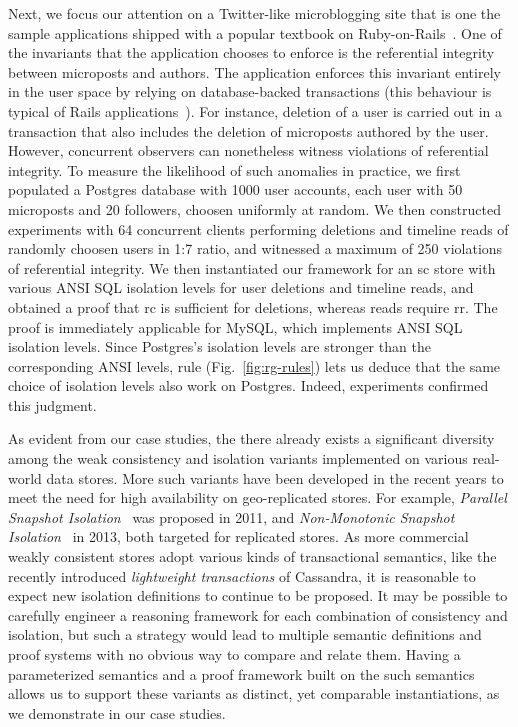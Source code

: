 Next, we focus our attention on a Twitter-like microblogging site that
is one the sample applications shipped with a popular textbook on
Ruby-on-Rails~\cite{railsbook}. One of the invariants that the
application chooses to enforce is the referential integrity between
microposts and authors. The application enforces this invariant
entirely in the user space by relying on database-backed transactions
(this behaviour is typical of Rails applications~\cite{bailisferal}).
For instance, deletion of a user is carried out in a transaction that
also includes the deletion of microposts authored by the user.
However, concurrent observers can nonetheless witness violations of
referential integrity. To measure the likelihood of such anomalies in
practice, we first populated a Postgres database with 1000 user
accounts, each user with 50 microposts and 20 followers, choosen
uniformly at random. We then constructed experiments with 64
concurrent clients performing deletions and timeline reads of randomly
choosen users in 1:7 ratio, and witnessed a maximum of 250 violations
of referential integrity. We then instantiated our framework for an
{\sc sc} store with various ANSI SQL isolation levels for user
deletions and timeline reads, and obtained a proof that {\sc rc} is
sufficient for deletions, whereas reads require {\sc rr}. The proof is
immediately applicable for MySQL, which implements ANSI SQL isolation
levels. Since Postgres's isolation levels are stronger than the
corresponding ANSI levels,  rule
(Fig.~\ref{fig:rg-rules}) lets us deduce that the same choice of
isolation levels also work on Postgres. Indeed, experiments confirmed
this judgment.

As evident from our case studies, the there already exists a
significant diversity among the weak consistency and isolation
variants implemented on various real-world data stores. More such
variants have been developed in the recent years to meet the need for
high availability on geo-replicated stores. For example,
\emph{Parallel Snapshot Isolation}~\cite{psi} was proposed in 2011,
and \emph{Non-Monotonic Snapshot Isolation}~\cite{nmsi} in 2013, both
targeted for replicated stores. As more commercial weakly consistent
stores adopt various kinds of transactional semantics, like the
recently introduced \emph{lightweight transactions} of Cassandra, it
is reasonable to expect new isolation definitions to continue to be
proposed. It may be possible to carefully engineer a reasoning
framework for each combination of consistency and isolation, but such
a strategy would lead to multiple semantic definitions and proof
systems with no obvious way to compare and relate them. Having a
parameterized semantics and a proof framework built on the such
semantics allows us to support these variants as distinct, yet
comparable instantiations, as we demonstrate in our case studies.




